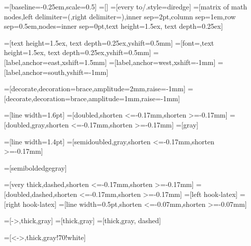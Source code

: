 
=[baseline=-0.25em,scale=0.5]
=[] %
=[every to/.style={diredge}]
=[matrix of math nodes,left delimiter=(,right delimiter=),inner sep=2pt,column sep=1em,row sep=0.5em,nodes={inner sep=0pt},text height=1.5ex, text depth=0.25ex]


=[text height=1.5ex, text depth=0.25ex,yshift=0.5mm]
=[font=\footnotesize,text height=1.5ex, text depth=0.25ex,yshift=0.5mm]
=[label,anchor=east,xshift=1.5mm]
=[label,anchor=west,xshift=-1mm]
=[label,anchor=south,yshift=-1mm]

\newcommand{\phantombox}[1]{\tikz[baseline=(current bounding box).east]{\path [use as bounding box] (0,0) rectangle #1;}}
=[decorate,decoration={brace,amplitude=2mm,raise=-1mm}]
=[decorate,decoration={brace,amplitude=1mm,raise=-1mm}]

=[line width=1.6pt] %
=[doubled,shorten <=-0.17mm,shorten >=-0.17mm]
=[doubled,gray,shorten <=-0.17mm,shorten >=-0.17mm]
=[gray]%

=[line width=1.4pt] %
=[semidoubled,gray,shorten <=-0.17mm,shorten >=-0.17mm]

=[semiboldedgegray]

=[very thick,dashed,shorten <=-0.17mm,shorten >=-0.17mm]
=[doubled,dashed,shorten <=-0.17mm,shorten >=-0.17mm]
=[left hook-latex]
=[right hook-latex]
=[line width=0.5pt,shorten <=-0.07mm,shorten >=-0.07mm]

=[->,thick,gray]
=[thick,gray]
=[thick,gray, dashed]

=[<->,thick,gray!70!white]

